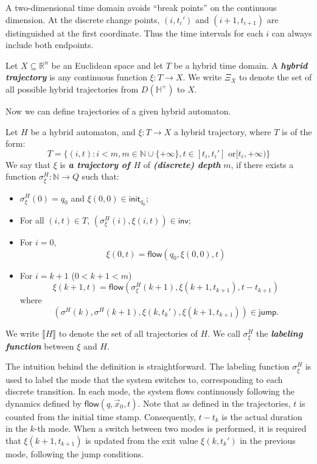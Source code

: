 \documentclass[envcountsect]{llncs}
\newcommand{\flow}{\mathsf{flow}}
\newcommand{\jump}{\mathsf{jump}}
\newcommand{\inv}{\mathsf{inv}}
\newcommand{\init}{\mathsf{init}}
\begin{document}
\begin{remark}
A two-dimensional time domain avoids ``break points'' on the continuous
 dimension. At the discrete change points, $(i,t_i')$ and $(i+1, t_{i+1})$ are
distinguished at the first coordinate. Thus the time intervals for each $i$ can
always include both endpoints. 
\end{remark}

\begin{definition}
 Let $X\subseteq\mathbb{R}^n$ be an Euclidean space and let $T$ be a hybrid 
time domain. A {\bf\em hybrid trajectory} is any continuous function 
$\xi: T \rightarrow X.$ We write $\Xi_X$ to denote the set of all possible
hybrid trajectories from  $D(\mathbb{H}^+)$ to $X$. 
 \end{definition}

Now we can define trajectories of a given hybrid automaton. 

\begin{definition}\label{trajec}
Let $H$ be a hybrid automaton, and $\xi: T\rightarrow X$ a hybrid trajectory, 
where $T$ is of the form:
$$T = \{(i,t): i< m, m\in \mathbb{N}\cup\{+\infty\}, t\in [t_i, t_i'] \mbox{ or
} [t_i, +\infty) \}$$
We say that $\xi$ is {\bf\em a trajectory of $H$} of {\bf\em (discrete) depth} 
$m$, if there exists a function $\sigma^H_{\xi}: \mathbb{N}\rightarrow Q$ such
that:
\begin{itemize}
\item $\sigma^H_{\xi}(0) = q_0$ and $\xi(0,0)\in \init_{q_0}$;
\item For all $(i, t)\in T$, $(\sigma^H_{\xi}(i), \xi(i,t))\in \inv$;
\item For $i=0$,
$$\xi(0,t) = \flow(q_0, \xi(0,0), t)$$ 
\item For $i = k+1$ ($0< k+1<m$)
$$\xi(k+1, t) = \flow( \sigma^H_{\xi}(k+1), \xi(k+1, t_{k+1}), t - t_{k+1})$$
where 
$$(\sigma^H(k), \sigma^H(k+1), \xi(k, t_k'), \xi(k+1,t_{k+1}))\in \jump.$$ 
\end{itemize}
We write $\llbracket H\rrbracket$ to denote the set of all trajectories of $H$. 
We call $\sigma^H_{\xi}$ the {\bf\em labeling function} between $\xi$ and $H$.
\end{definition}

The intuition behind the definition is straightforward. The labeling function 
$\sigma_{\xi}^H$ is used to label the mode that the system switches to,
corresponding to each discrete transition. In each mode, the system flows
continuously following the dynamics defined by $\flow(q, \vec x_0, t)$. Note
that as defined in the trajectories, $t$ is counted from the initial time stamp.
Consequently, $t-t_k$ is the actual duration in the $k$-th mode. When a switch
between  two modes is performed, it is required that $\xi(k+1, t_{k+1})$ is
updated from the exit value $\xi(k, t_k')$ in the previous mode, following the
jump conditions.
\end{document}

